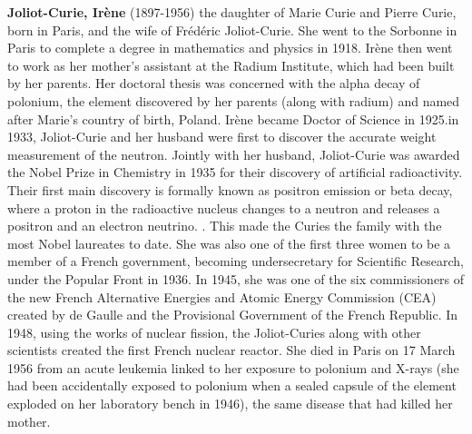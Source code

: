 \textbf{Joliot-Curie, Irène} (1897-1956) the daughter of Marie Curie and Pierre Curie, born in Paris, and the wife of Frédéric Joliot-Curie. She went to the Sorbonne in Paris to complete a degree in mathematics and physics in 1918. Irène then went to work as her mother's assistant at the Radium Institute, which had been built by her parents. Her doctoral thesis was concerned with the alpha decay of polonium, the element discovered by her parents (along with radium) and named after Marie's country of birth, Poland. Irène became Doctor of Science in 1925.in 1933, Joliot-Curie and her husband were first to discover the accurate weight measurement of the neutron. Jointly with her husband, Joliot-Curie was awarded the Nobel Prize in Chemistry in 1935 for their discovery of artificial radioactivity. Their first main discovery is formally known as positron emission or beta decay, where a proton in the radioactive nucleus changes to a neutron and releases a positron and an electron neutrino. . This made the Curies the family with the most Nobel laureates to date. She was also one of the first three women to be a member of a French government, becoming undersecretary for Scientific Research, under the Popular Front in 1936. In 1945, she was one of the six commissioners of the new French Alternative Energies and Atomic Energy Commission (CEA) created by de Gaulle and the Provisional Government of the French Republic. In 1948, using the works of nuclear fission, the Joliot-Curies along with other scientists created the first French nuclear reactor. She died in Paris on 17 March 1956 from an acute leukemia linked to her exposure to polonium and X-rays (she had been accidentally exposed to polonium when a sealed capsule of the element exploded on her laboratory bench in 1946), the same disease that had killed her mother.

